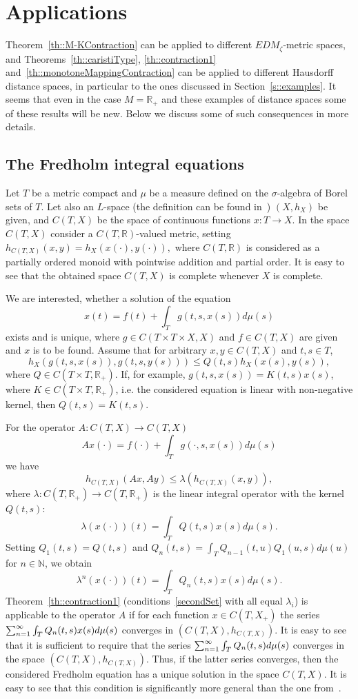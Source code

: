 \documentclass[12pt]{amsart}          %
\newcommand{\RR}{\mathbb R}
\begin{document}
\section{Applications }\label{s::applications}
{
Theorem~\ref{th::M-KContraction} can be applied to different $EDM_\zeta$-metric spaces, and
Theorems~\ref{th::caristiType}, \ref{th::contraction1} and~\ref{th::monotoneMappingContraction} can be applied to different Hausdorff distance spaces, in particular to the ones discussed in Section~\ref{s::examples}. 
It seems that even in the case $M = \RR_+$ and these examples of distance spaces  some of these results will be new. Below we discuss some of such consequences in more details.
}

\subsection{The Fredholm integral equations}\label{s::fredholmEquation}
Let $T$ be a metric compact and $\mu$ be a measure defined on the $\sigma$-algebra of Borel sets of $T$. Let also {an} $L$-space {(the definition can be found in~\cite{Vahrameev, Babenko19, Babenko20,Babenko21})}  $(X,h_X)$ be given, and $C(T,X)$ be the space of continuous functions $x\colon T\to X$. In the space $C(T,X)$ consider a $C(T,\mathbb{R})$-valued metric, setting
$
h_{C(T,X)}(x,y)=h_X(x(\cdot),y(\cdot)),
$
where $C(T,\RR)$ is considered as a partially ordered monoid with pointwise addition and partial order.
It is easy to see that the obtained space $C(T,X)$ is complete whenever $X$ is complete.

We are interested, whether a solution of the equation
$$
x(t)=f(t)+\int_Tg(t,s,x(s))d\mu(s)
$$
exists and is unique, where
$g\in C(T\times T\times X, X)$ and $f\in C(T,X)$ are given and $x$ is to be found.
Assume that for arbitrary $x,y\in C(T,X)$ and $t,s\in T$, 
$$
h_{X}(g(t,s,x(s)),g(t,s,y(s)))\le Q(t,s)h_X(x(s),y(s)),
$$
where $Q\in C(T\times T,\mathbb{R}_+)$. If, for example, $g(t,s,x(s))=K(t,s)x(s)$, where $K\in C(T\times T,\mathbb{R}_+)$, i.e. the considered equation is linear with non-negative kernel, then $Q(t,s)=K(t,s)$. 

For the operator $A\colon C(T,X)\to C(T,X)$
$$
Ax(\cdot)=f(\cdot)+\int_Tg(\cdot,s,x(s))d\mu(s)
$$
we have
$$
h_{C(T,X)}(Ax,Ay)\le \lambda(h_{C(T,X)}(x,y)),
$$
where $\lambda\colon C(T,\RR_+)\to C(T,\RR_+)$ is the linear integral operator with the kernel $Q(t,s)$:
$$
\lambda(x(\cdot))(t)=\int_TQ(t,s)x(s)d\mu(s).
$$
Setting $Q_1(t,s)=Q(t,s)$ and $Q_n(t,s)=\int_TQ_{n-1}(t,u)Q_1(u,s)d\mu(u)$ for $n\in\mathbb{N}$, we obtain
$$
\lambda^n(x(\cdot))(t)=\int_TQ_n(t,s)x(s)d\mu(s).
$$
Theorem~\ref{th::contraction1} (conditions~\eqref{secondSet} with all equal $\lambda_i$) is applicable to the operator $A$ if for each function $x\in C(T,X_+)$ the series
$
\sum\nolimits\nolimits_{n=1}^\infty \int_TQ_n(t,s)x(s)d\mu(s)
$
converges in  $(C(T,X),h_{C(T,X)})$.
It is easy to see that it is sufficient to require that the series
$
\sum\nolimits\nolimits_{n=1}^\infty \int_TQ_n(t,s)d\mu(s)
$
converges in the space $(C(T,X),h_{C(T,X)})$. Thus, if the latter series converges, then the considered Fredholm equation has a unique solution in the space $C(T,X)$. It is easy to see that this condition is significantly more general than the one from~\cite{Babenko19}.
\end{document}
